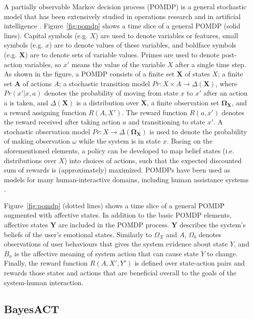 A partially observable Markov decision process (POMDP) is a general stochastic model that has been extensively studied in operations research and in artificial intelligence \cite{monahan1982state, poupart2011introduction}. Figure~\ref{fig:pomdp} shows a time slice of a general POMDP (solid lines). Capital symbols (e.g. $X$) are used to denote variables or features, small symbols (e.g. $x$) are to denote values of these variables, and boldface symbols (e.g. $\mathbf{X}$) are to denote sets of variable values. Primes are used to denote post-action variables, so $x'$ means the value of the variable $X$ after a single time step. As shown in the figure, a POMDP consists of a finite set $\mathbf{X}$ of states $X$; a finite set $\mathbf{A}$ of actions $A$; a stochastic transition model $Pr : X \times A \to \Delta(\mathbf{X})$, where $Pr(x'|x, a)$ denotes the probability of moving from state $x$ to $x'$ after an action a is taken, and $\Delta(\mathbf{X})$ is a distribution over $\mathbf{X}$, a finite observation set $\mathbf{\Omega_{X}}$, and a reward assigning function $R(A, X')$. The reward function $R(a, x')$ denotes the reward received after taking action $a$ and transitioning to state $x'$. A stochastic observation model $Pr : X \to \Delta(\mathbf{\Omega_{X}})$ is used to denote the probability of making observation $\omega$ while the system is in state $x$. Basing on the aforementioned elements, a policy can be developed to map belief states (i.e. distributions over $X$) into choices of actions, such that the expected discounted sum of rewards is (approximately) maximized. POMDPs have been used as models for many human-interactive domains, including human assistance systems \cite{hoey2010automated}.

Figure~\ref{fig:pomdp} (dotted lines) shows a time slice of a general POMDP augmented with affective states. In addition to the basic POMDP elements, affective states $\mathbf{Y}$ are included in the POMDP process. $\mathbf{Y}$ describes the system's beliefs of the user's emotional states. Similarly to $\Omega_{X}$ and $A$, $\Omega_{b}$ denotes observations of user behaviours that gives the system evidence about state $Y$, and $B_{a}$ is the affective meaning of system action that can cause state $Y$ to change. Finally, the reward function $R(A, X', Y')$ is defined over state-action pairs and rewards those states and actions that are beneficial overall to the goals of the system-human interaction. 

\subsection{BayesACT}

